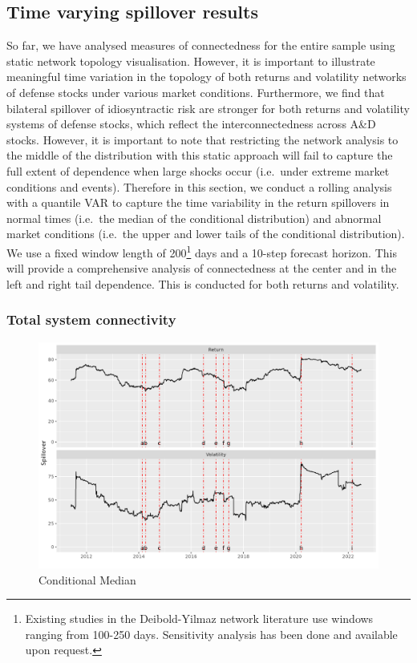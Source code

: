 \documentclass[
  letterpaper,
  DIV=11,
  numbers=noendperiod]{scrartcl}
\begin{document}
\hypertarget{time-varying-spillover-results}{%
\subsection{Time varying spillover
results}\label{time-varying-spillover-results}}

So far, we have analysed measures of connectedness for the entire sample
using static network topology visualisation. However, it is important to
illustrate meaningful time variation in the topology of both returns and
volatility networks of defense stocks under various market conditions.
Furthermore, we find that bilateral spillover of idiosyntractic risk are
stronger for both returns and volatility systems of defense stocks,
which reflect the interconnectedness across A\&D stocks. However, it is
important to note that restricting the network analysis to the middle of
the distribution with this static approach will fail to capture the full
extent of dependence when large shocks occur (i.e.~under extreme market
conditions and events). Therefore in this section, we conduct a rolling
analysis with a quantile VAR to capture the time variability in the
return spillovers in normal times (i.e.~the median of the conditional
distribution) and abnormal market conditions (i.e.~the upper and lower
tails of the conditional distribution). We use a fixed window length of
200\footnote{Existing studies in the Deibold-Yilmaz network literature
  use windows ranging from 100-250 days. Sensitivity analysis has been
  done and available upon request.} days and a 10-step forecast horizon.
This will provide a comprehensive analysis of connectedness at the
center and in the left and right tail dependence. This is conducted for
both returns and volatility.

\hypertarget{total-system-connectivity}{%
\subsubsection{Total system
connectivity}\label{total-system-connectivity}}

\begin{figure}[H]

{\centering \includegraphics{plots/fig-TCI50.png}

}

\caption{\label{fig-TCI50}Conditional Median}

\end{figure}
\end{document}
